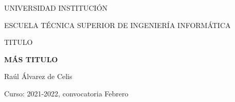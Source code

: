 \begin{titlepage}\thispagestyle{empty}%
	\begin{minipage}[c][0.99\textheight][t]{0.95\columnwidth}%
		\begin{center}
			\par\end{center}
		\bigskip{}
		\begin{singlespace}
			\begin{center}
				{\large{}UNIVERSIDAD  INSTITUCIÓN}\vspace{0.7cm}
				\par\end{center}
			\begin{center}
				{\large{}ESCUELA TÉCNICA SUPERIOR DE INGENIERÍA INFORMÁTICA}\vspace{0.5cm}
				\par\end{center}
			\begin{center}
				TITULO {\Large{}\vspace{0.8cm}
				}
				\par\end{center}{\Large \par}
		\end{singlespace}
		\begin{center}
			\textbf{\Large{}MÁS TITULO \\}

			\par\end{center}{\Large \par}
		\vfill{}
		\begin{flushleft}
			\qquad{}Raúl Álvarez de Celis\bigskip{}
			\par\end{flushleft}
		\begin{flushleft}

			\par\end{flushleft}
		\begin{flushleft}
			\qquad{}Curso: 2021-2022, convocatoria Febrero
			\par\end{flushleft}
		\bigskip{}
	\end{minipage}

\end{titlepage}

